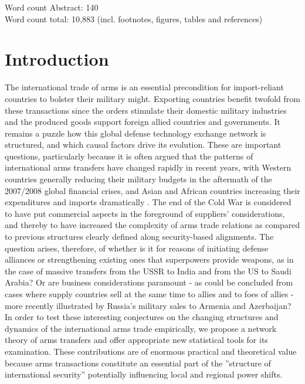 \documentclass[12pt, letterpaper]{article}
\numberwithin{equation}{section}
\begin{document}
\begin{center}
Word count Abstract: 140 \\[0.1cm]
Word count total: 10,883 (incl. footnotes, figures, tables and references)
\end{center}    
\newpage

 \section{Introduction}
\doublespacing
The international trade of arms is an essential precondition for import-reliant countries to bolster their military might. Exporting countries benefit twofold from these transactions since the orders stimulate their domestic military industries and the produced goods support foreign allied countries and governments. It remains a puzzle how this global defense technology exchange network is structured, and which causal factors drive its evolution. These are important questions, particularly because it is often argued that the patterns of international arms transfers have changed rapidly in recent years, with Western countries generally reducing their military budgets in the aftermath of the 2007/2008 global financial crises, and Asian and African countries increasing their expenditures and imports dramatically \citep[][175-182]{SIPRI:14}. The end of the Cold War is considered to have put commercial aspects in the foreground of suppliers' considerations, and thereby to have increased the complexity of arms trade relations as compared to previous structures clearly defined along security-based alignments. 
The question arises, therefore, of whether is it for reasons of initiating defense alliances or strengthening existing ones that superpowers provide weapons, as in the case of massive transfers from the USSR to India and from the US to Saudi Arabia?
Or are business considerations paramount - as could be concluded from cases where supply countries sell at the same time to allies and to foes of allies - more recently illustrated by Russia's military sales to Armenia and Azerbaijan?
In order to test these interesting conjectures on the changing structures and dynamics of the international arms trade empirically, we propose a network theory of arms transfers and offer appropriate new statistical tools for its examination. These contributions are of enormous practical and theoretical value because arms transactions constitute an essential part of the ''structure of international security'' \citep{BuzaWaev:03} potentially influencing local and regional power shifts.       
 
\end{document}
